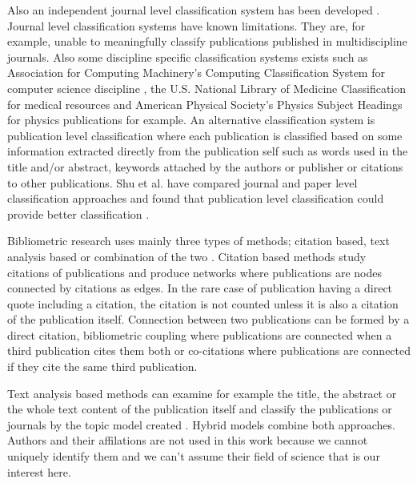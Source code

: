 Also an independent journal level classification system has been 
developed \cite{archambault_towards_2011}.
Journal level classification systems have known limitations.
They are, for example, unable to meaningfully classify
publications published in multidiscipline journals.
Also some discipline specific classification systems exists such 
as Association for Computing Machinery's Computing Classification 
System for computer science discipline \cite{noauthor_2012_2020}, 
the U.S. National Library
of Medicine Classification \cite{noauthor_national_2020} for medical 
resources and American Physical Society's Physics Subject Headings
\cite{noauthor_american_2020} for physics publications for example.
An alternative classification system is publication level 
classification where each publication is classified based on some 
information extracted directly from the publication self such as
words used in the title and/or abstract, keywords attached by the
authors or publisher or citations to other publications.
Shu et al. have compared journal and paper level classification
approaches and found that publication level classification could
provide better classification \cite{shu_comparing_2019}.

Bibliometric research uses mainly three types of methods; citation 
based, text analysis based or combination of the two 
\cite{janssens_hybrid_2009}. Citation based methods study 
citations of publications and produce networks where publications 
are nodes connected by citations as edges. In the rare case of 
publication having a direct quote including a citation, the 
citation is not counted unless it is also a citation of the 
publication itself. Connection between two publications can be 
formed by a direct citation, bibliometric coupling where 
publications are connected when a third publication cites them 
both or co-citations where publications are connected if they 
cite the same third publication.

Text analysis based methods can examine for example the title, the 
abstract or the whole text content of the publication itself and 
classify the publications or journals by the topic model created 
\cite{blei_latent_2003}.
Hybrid models combine both approaches. Authors and their
affilations are not used in this work because we cannot uniquely
identify them and we can't assume their field of science that is
our interest here.

